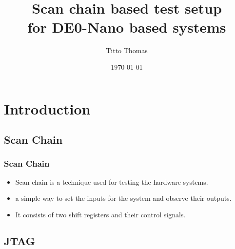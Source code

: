 \documentclass{beamer}
\title[Scan chain for DE0-Nano systems]{Scan chain based test setup \\ for DE0-Nano based systems} %
\author{Titto Thomas} %
\institute[EE 705] %
{
Wadhwani Electronics Laboratory \\ EE Dept. IIT Bombay \\ %
\medskip
\textit{tittothomas@iitb.ac.in} %
}
\date{\today} %
\begin{document}
\begin{frame}
\titlepage %
\end{frame}


\section{Introduction} %
\subsection{Scan Chain}
\begin{frame}
\frametitle{Scan Chain}

\begin{figure}[h!]
\centering

\end{figure}

\begin{itemize}
\item Scan chain is a technique used for testing the hardware systems.
\item a simple way to set the inputs for the system and observe their outputs.
\item It consists of two shift registers and their control signals.
\end{itemize}
\end{frame}
\subsection{JTAG}
\end{document}
